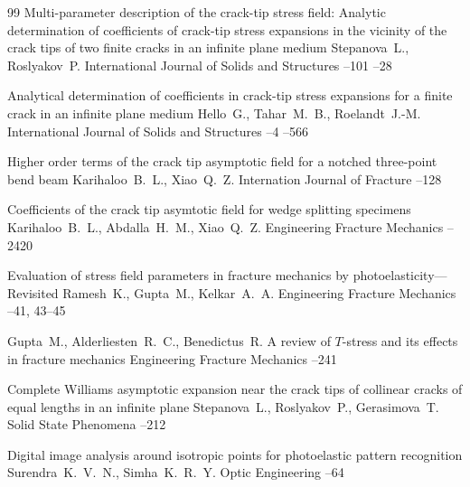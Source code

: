 \begin{thebibliography}{99}
\paper  Multi-parameter description of the crack-tip stress field: Analytic determination of coefficients of crack-tip stress expansions in the vicinity of the crack tips of two finite cracks in an infinite plane medium
\by Stepanova~L.,  Roslyakov~P.
\jour International Journal of Solids and Structures
--101
--28

\paper  Analytical determination of coefficients in crack-tip stress expansions for a finite crack in an infinite plane medium
\by Hello~G.,  Tahar~M.~B., Roelandt~J.-M.
\jour International Journal of Solids and Structures
--4
--566

\paper Higher order terms of the crack tip asymptotic field for a notched three-point bend beam
\by Karihaloo~B.~L.,  Xiao~Q.~Z.
\jour Internation Journal of Fracture
--128

\paper  Coefficients of the crack tip asymtotic field for wedge splitting specimens
\by Karihaloo~B.~L., Abdalla~H.~M., Xiao~Q.~Z.
\jour Engineering Fracture Mechanics
--2420

\paper  Evaluation of stress field parameters in fracture mechanics by photoelasticity—Revisited
\by Ramesh~K., Gupta~M., Kelkar~A.~A.
\jour Engineering Fracture Mechanics
--41, 43--45



\by Gupta~M., Alderliesten~R.~C., Benedictus~R.
\paper  A review of $T$-stress and its effects in fracture mechanics
\jour Engineering Fracture Mechanics
--241

\paper Complete Williams asymptotic expansion near the crack tips of collinear cracks of equal lengths in an infinite plane
\by Stepanova~L., Roslyakov~P., Gerasimova~T.
\jour Solid State Phenomena
--212

\paper Digital image analysis around isotropic points for photoelastic pattern recognition
\by Surendra~K.~V.~N., Simha~K.~R.~Y.
\jour Optic Engineering
--64


\end{thebibliography}


%
